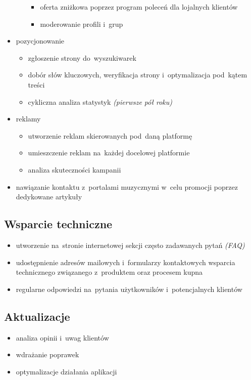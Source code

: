 \documentclass[12pt]{article}
\begin{document}
\begin{itemize}
\begin{itemize}
\begin{itemize}
            \item oferta zniżkowa poprzez program poleceń dla lojalnych klientów
            \item moderowanie profili i~grup \end{itemize} \end{itemize}
    \item pozycjonowanie \begin{itemize}
        \item zgłoszenie strony do~wyszukiwarek
        \item dobór słów kluczowych, weryfikacja strony i~optymalizacja pod~kątem treści
        \item cykliczna analiza statystyk \textit{(pierwsze pół roku)} \end{itemize}
    \item reklamy \begin{itemize}
        \item utworzenie reklam skierowanych pod~daną platformę
        \item umieszczenie reklam na~każdej docelowej platformie
        \item analiza skuteczności kampanii \end{itemize}
    \item nawiązanie kontaktu z~portalami muzycznymi w~celu promocji poprzez dedykowane artykuły
\end{itemize}

\subsection{Wsparcie techniczne}

\begin{itemize}
    \item utworzenie na~stronie internetowej sekcji często zadawanych pytań \textit{(FAQ)}
    \item udostępnienie adresów mailowych i~formularzy kontaktowych wsparcia technicznego związanego z~produktem oraz procesem kupna
    \item regularne odpowiedzi na~pytania użytkowników i~potencjalnych klientów
\end{itemize}

\subsection{Aktualizacje}

\begin{itemize}
    \item analiza opinii i~uwag klientów
    \item wdrażanie poprawek
    \item optymalizacje działania aplikacji
\end{itemize}
\end{document}
